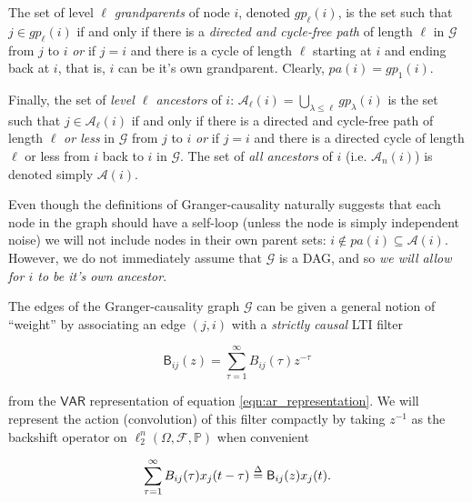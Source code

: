\documentclass[12pt]{article}
\def\gcg{\mathcal{G}}  %
\def\VAR{\mathsf{VAR}}  %
\def\B{\mathsf{B}}  %
\newcommand{\pa}[1]{pa(#1)}  %
\newcommand{\anc}[1]{\mathcal{A}(#1)}  %
\newcommand{\ancn}[2]{\mathcal{A}_{#1}(#2)}  %
\newcommand{\gpn}[2]{gp_{#1}(#2)}  %
\begin{document}
\begin{definition}
The set of level $\ell$ \textit{grandparents} of node $i$, denoted
$\gpn{\ell}{i}$, is the set such that $j \in \gpn{\ell}{i}$ if and only if
there is a \textit{directed and cycle-free path} of length $\ell$ in
$\gcg$ from $j$ to $i$ \textit{or} if $j = i$ and there is a cycle of
length $\ell$ starting at $i$ and ending back at $i$, that is, $i$ can be
it's own grandparent.  Clearly, $\pa{i} = \gpn{1}{i}$.

Finally, the set of \textit{level $\ell$ ancestors} of
$i$: $\ancn{\ell}{i} = \bigcup_{\lambda \le \ell}\gpn{\lambda}{i}$ is the set such that
$j \in \ancn{\ell}{i}$ if and only if there is a directed and cycle-free
path of length $\ell$ \textit{or less} in $\gcg$ from $j$ to $i$
\textit{or} if $j = i$ and there is a directed cycle of length $\ell$ or
less from $i$ back to $i$ in $\gcg$.  The set of \textit{all
  ancestors} of $i$ (i.e. $\ancn{n}{i}$) is denoted simply $\anc{i}$.
\end{definition}

Even though the definitions of Granger-causality naturally suggests
that each node in the graph should have a self-loop (unless the node
is simply independent noise) we will not include nodes in their own
parent sets: $i \not\in \pa{i} \subseteq \anc{i}$.  However, we do not
immediately assume that $\gcg$ is a DAG, and so \textit{we will allow for $i$
to be it's own ancestor}.

The edges of the Granger-causality graph $\gcg$ can be given a general
notion of ``weight'' by associating an edge $(j, i)$ with a
\textit{strictly causal} LTI filter

\begin{equation}
  \label{eqn:filter}
  \B_{ij}(z) = \sum_{\tau = 1}^{\infty} B_{ij}(\tau)z^{-\tau}
\end{equation}

from the $\VAR$ representation of equation
\ref{eqn:ar_representation}.  We will represent the action
(convolution) of this filter compactly by taking $z^{-1}$ as the
backshift operator on $\ell_2^n(\Omega, \mathcal{F}, \mathbb{P})$ when
convenient

\begin{equation}
  \sum_{\tau = 1}^\infty B_{ij}(\tau)x_j(t - \tau) \defeq \B_{ij}(z)x_j(t).
\end{equation}

\end{document}
